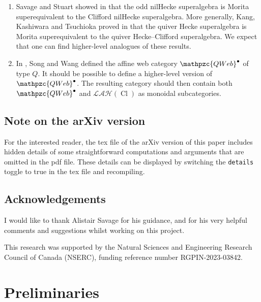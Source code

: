 \documentclass[11pt]{amsart}
\theoremstyle{definition}
\numberwithin{equation}{section}
\begin{document}
\begin{enumerate}
\item[\textbullet] Savage and Stuart showed in \cite[Cor.~7.5]{Savage-Stuart} that the odd nilHecke superalgebra is Morita superequivalent to the Clifford nilHecke superalgebra. More generally, Kang, Kashiwara and Tsuchioka proved in \cite[Thm.~3.13]{Kang-Kashiwara-Tsuchioka} that the quiver Hecke superalgebra is Morita superequivalent to the quiver Hecke--Clifford superalgebra. We expect that one can find higher-level analogues of these results.
\item[\textbullet] In \cite{Song-XWang}, Song and Wang defined the affine web category $ \mathpzc{QWeb}^{\bullet} $ of type \(Q\). It should be possible to define a higher-level version of $ \mathpzc{QWeb}^{\bullet} $. The resulting category should then contain both $ \mathpzc{QWeb}^{\bullet} $ and $ \mathcal{LAH}(\operatorname{Cl}) $ as monoidal subcategories.
\end{enumerate}





\subsection*{Note on the arXiv version}

For the interested reader, the tex file of the arXiv version of this paper includes hidden details of some straightforward computations and arguments that are omitted in the pdf file. These details can be displayed by switching the \texttt{details} toggle to true in the tex file and recompiling.


\subsection*{Acknowledgements} I would like to thank Alistair Savage for his guidance, and for his very helpful comments and suggestions whilst working on this project.

This research was supported by the Natural Sciences and Engineering Research Council of Canada (NSERC), funding reference number RGPIN-2023-03842.










\section{Preliminaries} \label{Preliminaries_paper}
\end{document}
